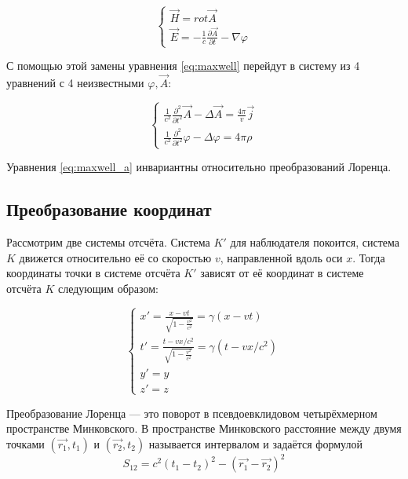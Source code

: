 \documentclass{article}
\begin{document}
\begin{equation}
    \begin{cases}
    \vec{H}=rot\vec{A}\\
    \vec{E}=-\frac{1}{c}\frac{\partial\vec{A}}{\partial t}-\nabla\varphi
    \end{cases}
\end{equation}

С помощью этой замены уравнения \eqref{eq:maxwell} перейдут в систему из 4 уравнений с 4 неизвестными $\varphi,\vec{A}$:

\begin{equation}\label{eq:maxwell_a}
    \begin{cases}
    \frac{1}{c^2}\frac{\partial^2}{\partial t^2}\vec{A}-\Delta\vec{A}=\frac{4\pi}{v}\vec{j}\\
    \frac{1}{c^2}\frac{\partial^2}{\partial t^2}\varphi-\Delta\varphi=4\pi\rho
    \end{cases}
\end{equation}

Уравнения \eqref{eq:maxwell_a} инвариантны относительно преобразований Лоренца.

\subsection{Преобразование координат}

Рассмотрим две системы отсчёта. Система $K'$ для наблюдателя покоится, система $K$ движется относительно её со скоростью $v$, направленной вдоль оси $x$. Тогда координаты точки в системе отсчёта $K'$ зависят от её координат в системе отсчёта $K$ следующим образом:

\begin{equation}\label{eq:lorentz_coord}
    \begin{cases}
    x'=\frac{x-vt}{\sqrt{1-\frac{v^2}{c^2}}}=\gamma\left(x-vt\right)\\
    t'=\frac{t-vx/c^2}{\sqrt{1-\frac{v^2}{c^2}}}=\gamma\left(t-vx/c^2\right)\\
    y'=y\\
    z'=z
    \end{cases}
\end{equation}


Преобразование Лоренца — это поворот в псевдоевклидовом четырёхмерном пространстве Минковского. В пространстве Минковского расстояние между двумя точками $\left(\vec{r_1}, t_1\right)$ и $\left(\vec{r_2}, t_2\right)$ называется интервалом и задаётся формулой
\begin{equation}
    S_12=c^2\left(t_1-t_2\right)^2-\left(\vec{r_1}-\vec{r_2}\right)^2
\end{equation}
\end{document}
